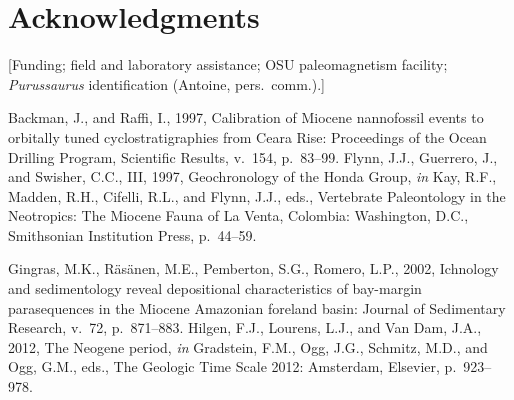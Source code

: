 \documentclass[12pt]{article}
\begin{document}
\section*{Acknowledgments}
\small [Funding; field and laboratory assistance; OSU paleomagnetism facility;
\textit{Purussaurus} identification (Antoine, pers.\ comm.).]

\begin{thebibliography}{}
\small
{} Backman, J., and Raffi, I., 1997,
Calibration of Miocene nannofossil events to orbitally tuned cyclostratigraphies from Ceara
Rise: Proceedings of the Ocean Drilling Program, Scientific Results, v.~154, p.~83--99.
 Flynn, J.J., Guerrero, J., and Swisher, C.C., III, 1997,
Geochronology of the Honda Group, \textit{in} Kay, R.F., Madden, R.H., Cifelli, R.L., and Flynn,
J.J., eds., Vertebrate Paleontology in the Neotropics: The Miocene Fauna of La Venta, Colombia:
Washington, D.C., Smithsonian Institution Press, p.~44--59.

 Gingras, M.K., R\"as\"anen, M.E., Pemberton,
S.G., Romero, L.P., 2002, Ichnology and sedimentology reveal depositional characteristics
of bay-margin parasequences in the Miocene Amazonian foreland basin: Journal of Sedimentary
Research, v.~72, p.~871--883.
 Hilgen, F.J., Lourens, L.J., and Van Dam, J.A., 2012,
The Neogene period, \textit{in} Gradstein, F.M., Ogg, J.G., Schmitz, M.D., and Ogg, G.M., eds.,
The Geologic Time Scale 2012: Amsterdam, Elsevier, p.~923--978.


\end{thebibliography}
\end{document}
